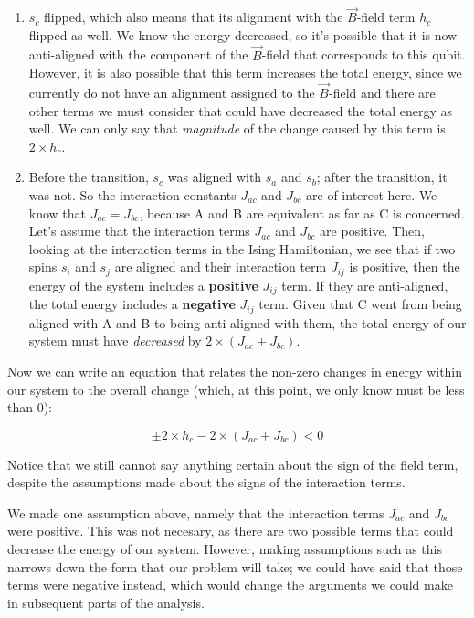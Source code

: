 \documentclass[]{article}
\begin{document}
\begin{enumerate}
\def\labelenumi{\arabic{enumi}.}
\tightlist
\item
  \(s_c\) flipped, which also means that its alignment with the
  \(\vec{B}\)-field term \(h_c\) flipped as well. We know the energy
  decreased, so it's possible that it is now anti-aligned with the
  component of the \(\vec{B}\)-field that corresponds to this qubit.
  However, it is also possible that this term increases the total
  energy, since we currently do not have an alignment assigned to the
  \(\vec{B}\)-field and there are other terms we must consider that
  could have decreased the total energy as well. We can only say that
  \emph{magnitude} of the change caused by this term is
  \(2 \times h_c\).
\item
  Before the transition, \(s_c\) was aligned with \(s_a\) and \(s_b\);
  after the transition, it was not. So the interaction constants
  \(J_{ac}\) and \(J_{bc}\) are of interest here. We know that
  \(J_{ac}=J_{bc}\), because A and B are equivalent as far as C is
  concerned. Let's assume that the interaction terms \(J_{ac}\) and
  \(J_{bc}\) are positive. Then, looking at the interaction terms in the
  Ising Hamiltonian, we see that if two spins \(s_i\) and \(s_j\) are
  aligned and their interaction term \(J_{ij}\) is positive, then the
  energy of the system includes a \textbf{positive} \(J_{ij}\) term. If
  they are anti-aligned, the total energy includes a \textbf{negative}
  \(J_{ij}\) term. Given that C went from being aligned with A and B to
  being anti-aligned with them, the total energy of our system must have
  \emph{decreased} by \(2 \times (J_{ac} + J_{bc})\).
\end{enumerate}

Now we can write an equation that relates the non-zero changes in energy
within our system to the overall change (which, at this point, we only
know must be less than 0):

\[\pm 2 \times h_c - 2 \times (J_{ac} + J_{bc}) < 0\]

Notice that we still cannot say anything certain about the sign of the
field term, despite the assumptions made about the signs of the
interaction terms.

We made one assumption above, namely that the interaction terms
\(J_{ac}\) and \(J_{bc}\) were positive. This was not necesary, as there
are two possible terms that could decrease the energy of our system.
However, making assumptions such as this narrows down the form that our
problem will take; we could have said that those terms were negative
instead, which would change the arguments we could make in subsequent
parts of the analysis.
\end{document}

